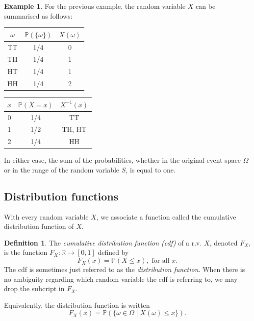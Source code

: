 \documentclass[
]{book}
\newcommand{\bbR}{\mathbb{R}}
\newcommand{\bbP}{\mathbb{P}}
\theoremstyle{definition}
\newtheorem{definition}{Definition}[chapter]
\theoremstyle{definition}
\newtheorem{example}{Example}[chapter]
\theoremstyle{definition}
\theoremstyle{definition}
\theoremstyle{remark}
\begin{document}
\begin{example}
\protect\hypertarget{exm:coinflip}{}\label{exm:coinflip}For the previous example, the random variable \(X\) can be summarised as follows:

\begin{longtable}[]{@{}ccc@{}}
\toprule
\(\omega\) & \(\bbP(\{\omega\})\) & \(X(\omega)\) \\
\midrule
\endhead
TT & 1/4 & 0 \\
TH & 1/4 & 1 \\
HT & 1/4 & 1 \\
HH & 1/4 & 2 \\
\bottomrule
\end{longtable}

\begin{longtable}[]{@{}ccc@{}}
\toprule
\(x\) & \(\bbP(X = x)\) & \(X^{-1}(x)\) \\
\midrule
\endhead
0 & 1/4 & TT \\
1 & 1/2 & TH, HT \\
2 & 1/4 & HH \\
\bottomrule
\end{longtable}

In either case, the sum of the probabilities, whether in the original event space \(\Omega\) or in the range of the random variable \(S\), is equal to one.
\end{example}

\hypertarget{distribution-functions}{%
\subsection{Distribution functions}\label{distribution-functions}}

With every random variable \(X\), we associate a function called the cumulative distribution function of \(X\).

\begin{definition}
The \emph{cumulative distribution function (cdf)} of a r.v. \(X\), denoted \(F_X\), is the function \(F_X:\bbR\to[0,1]\) defined by
\[
  F_X(x) = \bbP(X \leq x), \text{ for all } x.
\]
The cdf is sometimes just referred to as the \emph{distribution function}.
When there is no ambiguity regarding which random variable the cdf is referring to, we may drop the subcript in \(F_X\).
\end{definition}

Equivalently, the distribution function is written
\[
F_X(x) = \bbP\left(\{\omega \in \Omega \mid X(\omega) \leq x \} \right).
\]
\end{document}
